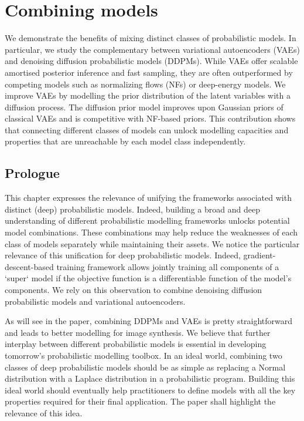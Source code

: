 \chapter{Combining models}\label{ch:03}

\begin{chapter_outline}

  We demonstrate the benefits of mixing distinct classes of probabilistic models. In particular, we study the complementary between variational autoencoders (VAEs) and denoising diffusion probabilistic models (DDPMs). While VAEs offer scalable amortised posterior inference and fast sampling, they are often outperformed by competing models such as normalizing flows (NFs) or deep-energy models. We improve VAEs by modelling the prior distribution of the latent variables with a diffusion process. The diffusion prior model improves upon Gaussian priors of classical VAEs and is competitive with NF-based priors.
  This contribution shows that connecting different classes of models can unlock modelling capacities and properties that are unreachable by each model class independently.
\end{chapter_outline}
\section{Prologue}
This chapter expresses the relevance of unifying the frameworks associated with distinct (deep) probabilistic models. Indeed, building a broad and deep understanding of different probabilistic modelling frameworks unlocks potential model combinations. These combinations may help reduce the weaknesses of each class of models separately while maintaining their assets. We notice the particular relevance of this unification for deep probabilistic models. Indeed, gradient-descent-based training framework allows jointly training all components of a `super` model if the objective function is a differentiable function of the model's components. We rely on this observation to combine denoising diffusion probabilistic models and variational autoencoders.

As will see in the paper, combining DDPMs and VAEs is pretty straightforward and leads to better modelling for image synthesis. We believe that further interplay between different probabilistic models is essential in developing tomorrow's probabilistic modelling toolbox. In an ideal world, combining two classes of deep probabilistic models should be as simple as replacing a Normal distribution with a Laplace distribution in a probabilistic program. Building this ideal world should eventually help practitioners to define models with all the key properties required for their final application. The paper shall highlight the relevance of this idea.

